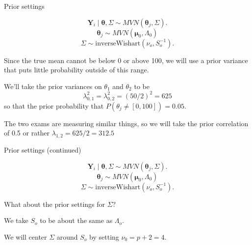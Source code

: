 \documentclass[ignorenonframetext,]{beamer}
\newcommand{\btheta}{{\bm\theta}}
\begin{document}
\begin{frame}{Prior settings}

\[\bm{Y}_i \mid \btheta, \Sigma \sim MVN(\btheta_j, \Sigma).\]
\[ \btheta_j \sim MVN(\bm{\mu}_0, \Lambda_0)\]
\[ \Sigma \sim \text{inverseWishart}(\nu_o, S_o^{-1}).\]

Since the true mean cannot be below 0 or above 100, we will use a prior
variance that puts little probability outside of this range.

We'll take the prior variances on \(\theta_1\) and \(\theta_2\) to be
\[\lambda_{0,1}^2 = \lambda_{0,2}^2 = (50/2)^2 = 625\] so that the prior
probability that \(P(\theta_j \neq [0,100]) =0.05.\)

The two exams are measuring similar things, so we will take the prior
correlation of 0.5 or rather \(\lambda_{1,2} = 625/2 = 312.5\)

\end{frame}

\begin{frame}{Prior settings (continued)}

\[\bm{Y}_i \mid \btheta, \Sigma \sim MVN(\btheta_j, \Sigma).\]
\[ \btheta_j \sim MVN(\bm{\mu}_0, \Lambda_0)\]
\[ \Sigma \sim \text{inverseWishart}(\nu_o, S_o^{-1}).\]

What about the prior settings for \(\Sigma?\)

We take \(S_o\) to be about the same as \(\Lambda_o.\)

We will center \(\Sigma\) around \(S_o\) by setting
\(\nu_0 = p + 2 = 4.\)

\end{frame}
\end{document}

